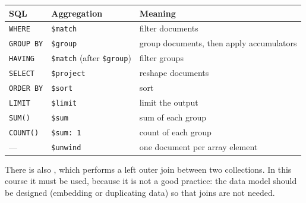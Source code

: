 \begin{center}
\begin{tabular}{lll}
\toprule
\textbf{SQL} & \textbf{Aggregation} & \textbf{Meaning} \\
\midrule
\texttt{WHERE} & \texttt{\$match} & filter documents \\
\texttt{GROUP BY} & \texttt{\$group} & group documents, then apply accumulators \\
\texttt{HAVING} & \texttt{\$match} (after \texttt{\$group}) & filter groups \\
\texttt{SELECT} & \texttt{\$project} & reshape documents \\
\texttt{ORDER BY} & \texttt{\$sort} & sort \\
\texttt{LIMIT} & \texttt{\$limit} & limit the output \\
\texttt{SUM()} & \texttt{\$sum} & sum of each group \\
\texttt{COUNT()} & \texttt{\$sum: 1} & count of each group \\
--- & \texttt{\$unwind} & one document per array element \\
\bottomrule
\end{tabular}
\end{center}

\begin{remark}
There is also , which performs a left outer join between two collections. In this course it must  be used, because it is not a good practice: the data model should be designed (embedding or duplicating data) so that joins are not needed.
\end{remark}

